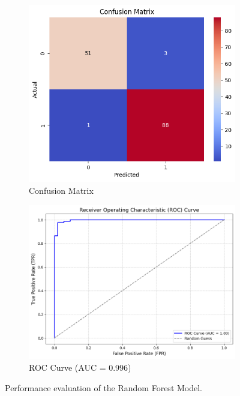 \documentclass[12pt]{article}
\begin{document}
\begin{figure}[H]
    \centering
    \begin{subfigure}[b]{0.4\textwidth}
        \centering
        \includegraphics[width=\textwidth]{assets/rf/rf-cm.png}
        \caption{Confusion Matrix}
        \label{fig:rf_cm}
    \end{subfigure}
    \hfill
    \begin{subfigure}[b]{0.4\textwidth}
        \centering
        \includegraphics[width=\textwidth]{assets/rf/rf-roc.png}
        \caption{ROC Curve (AUC = 0.996)}
        \label{fig:rf_roc}
    \end{subfigure}
    \caption{Performance evaluation of the Random Forest Model.}
    \label{fig:rf_cm_roc}
\end{figure}
\end{document}
